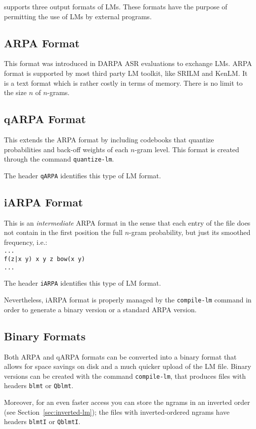 {\IRSTLM} supports three output formats of LMs. These formats have the
purpose of permitting  the use of LMs by  external programs.

\subsection{ARPA Format}
This format was  introduced in DARPA ASR evaluations  to exchange LMs.
ARPA format  is  supported by most third party LM toolkit, like SRILM and KenLM.
It is  a text format which is rather costly in terms of memory. There is no limit to
the size $n$ of $n$-grams.

\subsection{qARPA Format}
This extends the ARPA format by including codebooks that quantize 
probabilities and back-off weights of each $n$-gram level. This format
is created through the command {\tt quantize-lm}.

The header {\tt qARPA} identifies this type of LM format.

\subsection{iARPA Format}
This is an {\em intermediate} ARPA format in the sense that each entry of the file
does not contain in the first position the full $n$-gram probability, but just its
smoothed frequency, i.e.:\\
\noindent
{\tt ...\\
f(z|x y) x y z bow(x y)\\
...
}

The header {\tt iARPA} identifies this type of LM format.

\noindent
Nevertheless, iARPA format is properly managed by the {\tt compile-lm} command
in order to generate a binary version or a standard ARPA version.


\subsection{Binary Formats}
Both ARPA and qARPA formats can be converted into a binary format 
that allows for space savings on disk and a much quicker upload of
the LM file.  Binary versions can be created with the command 
{\tt compile-lm}, that produces files with  headers {\tt blmt} or {\tt Qblmt}.

\noindent
Moreover, for an even faster access you can store the ngrams in an inverted
order (see Section~\ref{sec:inverted-lm});
the files with inverted-ordered ngrams have headers  {\tt blmtI} or {\tt QblmtI}.

